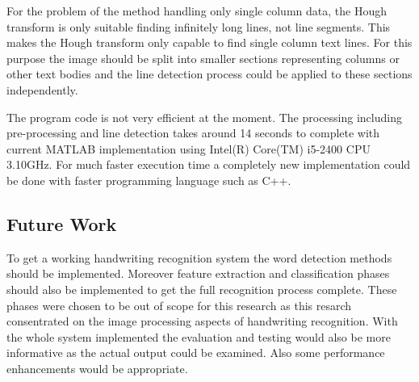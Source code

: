 \documentclass{article}
\begin{document}
      For the problem of the method handling only single column data, the Hough transform is only suitable finding infinitely long lines, not line segments. This makes the Hough transform only capable to find single column text lines. For this purpose the image should be split into smaller sections representing columns or other text bodies and the line detection process could be applied to these sections independently.

      The program code is not very efficient at the moment. The processing including pre-processing and line detection takes around 14 seconds to complete with current MATLAB implementation using Intel(R) Core(TM) i5-2400 CPU 3.10GHz. For much faster execution time a completely new implementation could be done with faster programming language such as C++.

    \subsection{Future Work}
      To get a working handwriting recognition system the word detection methods should be implemented. Moreover feature extraction and classification phases should also be implemented to get the full recognition process complete. These phases were chosen to be out of scope for this research as this resarch consentrated on the image processing aspects of handwriting recognition. With the whole system implemented the evaluation and testing would also be more informative as the actual output could be examined. Also some performance enhancements would be appropriate.

  \newpage
  
  
\end{document}

